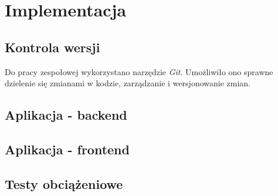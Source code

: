 \section{Implementacja}
\subsection{Kontrola wersji}
Do pracy zespołowej wykorzystano narzędzie \textit{Git}. Umożliwiło ono sprawne dzielenie się zmianami w kodzie, zarządzanie i wersjonowanie zmian.



\subsection{Aplikacja - backend}


\subsection{Aplikacja - frontend}


\subsection{Testy obciążeniowe}


